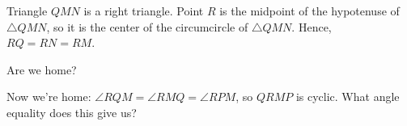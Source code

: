 









Triangle $QMN$ is a right triangle. Point $R$ is the midpoint of the hypotenuse of $\triangle QMN$, so it is the center of the circumcircle of $\triangle QMN$. Hence, $RQ = RN = RM$.

Are we home?







Now we're home: $\angle RQM = \angle RMQ = \angle RPM$, so $QRMP$ is cyclic. What angle equality does this give us?

